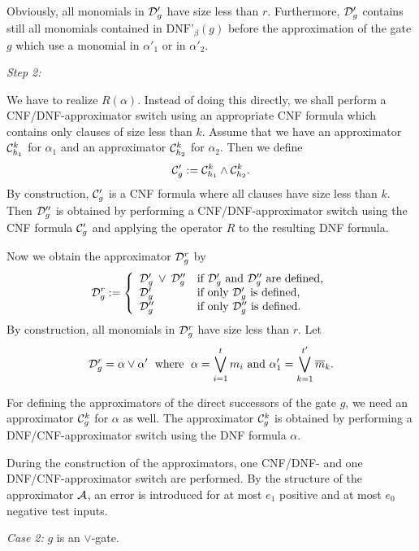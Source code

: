 \documentclass[11pt]{article}
\begin{document}
Obviously, all monomials in ${\cal D}'_g$ have size less than $r$. Furthermore, ${\cal D}'_g$ contains still all
monomials contained in $\mbox{DNF'}_{\beta}(g)$ before the approximation of the gate $g$ which use a monomial in
$\alpha'_1$ or in $\alpha'_2$.

\smallskip
\noindent
{\em Step 2:}

\smallskip
We have to realize $R(\alpha)$. Instead of doing this directly,
we shall perform a CNF/DNF-approximator switch using an appropriate CNF formula which contains only clauses of
size less than $k$.
Assume that we have an approximator ${\cal C}_{h_1}^k$ for $\alpha_1$ and an approximator ${\cal C}_{h_2}^k$ for
$\alpha_2$. Then we define 
$$
{\cal C}'_g := {\cal C}_{h_1}^k \wedge {\cal C}_{h_2}^k.
$$
By construction, ${\cal C}'_g$ is a CNF formula where all clauses have size less than $k$.
Then ${\cal D}''_g$ is obtained by performing a CNF/DNF-approximator switch using the CNF formula ${\cal C}'_g$
and applying the operator $R$ to the resulting DNF formula.

Now we obtain the approximator ${\cal D}_g^r$ by
$$
{\cal D}_g^r := \left\{ \begin{array}{ll}
                   {\cal D}'_g \: \vee \: {\cal D}''_g & \mbox{if ${\cal D}'_g$ and ${\cal D}''_g$ are defined,} \\
                   {\cal D}'_g  & \mbox{if only ${\cal D}'_g$ is defined,} \\
                   {\cal D}''_g & \mbox{if only ${\cal D}''_g$ is defined.} 
                            \end{array}
\right.
$$
By construction, all monomials in ${\cal D}_g^r$ have size less than $r$. Let
$$
{\cal D}_g^r = \alpha \vee \alpha' \; \mbox{ where } \; \alpha = \bigvee_{i=1}^t m_i \mbox{ and } 
\alpha'_1 =  \bigvee_{k=1}^{t'} \overline{m}_k.
$$

For defining the approximators of the direct successors of the gate $g$, we need an approximator
${\cal C}_g^k$ for $\alpha$ as well. The approximator ${\cal C}_g^k$ is obtained by performing a
DNF/CNF-approximator switch using the DNF formula $\alpha$.

\smallskip
During the construction of the approximators, one CNF/DNF- and one DNF/CNF-approximator switch are performed.
By the structure of the approximator ${\cal A}$, an error is introduced for at most $e_1$ positive and at
most $e_0$ negative test inputs.

\medskip
\noindent
{\em Case 2:} $g$ is an $\vee$-gate.
\end{document}
